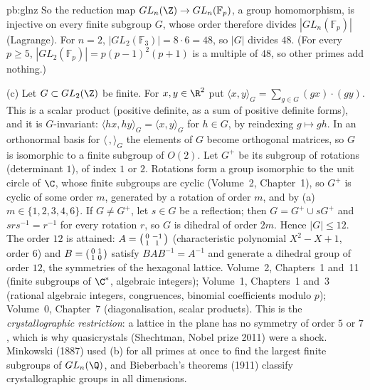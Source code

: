 \begin{solution}{pb:glnz}
So the reduction map $GL_n(\Z)\to GL_n(\mathbb F_p)$, a group homomorphism, is injective on every finite subgroup $G$, whose
order therefore divides $|GL_n(\mathbb F_p)|$ (Lagrange). For $n=2$, $|GL_2(\mathbb F_3)|=8\cdot6=48$, so $|G|$ divides $48$.
(For every $p\ge5$, $|GL_2(\mathbb F_p)|=p(p-1)^2(p+1)$ is a multiple of $48$, so other primes add nothing.)

(c) Let $G\subset GL_2(\Z)$ be finite. For $x,y\in\R^2$ put $\langle x,y\rangle_G=\sum_{g\in G}(gx)\cdot(gy)$. This is a scalar
product (positive definite, as a sum of positive definite forms), and it is $G$-invariant: $\langle hx,hy\rangle_G=\langle x,
y\rangle_G$ for $h\in G$, by reindexing $g\mapsto gh$. In an orthonormal basis for $\langle\,,\rangle_G$ the elements of $G$
become orthogonal matrices, so $G$ is isomorphic to a finite subgroup of $O(2)$. Let $G^+$ be its subgroup of rotations
(determinant $1$), of index $1$ or $2$. Rotations form a group isomorphic to the unit circle of $\C$, whose finite subgroups are
cyclic (Volume~2, Chapter~1), so $G^+$ is cyclic of some order $m$, generated by a rotation of order $m$, and by (a)
$m\in\{1,2,3,4,6\}$. If $G\ne G^+$, let $s\in G$ be a reflection; then $G=G^+\cup sG^+$ and $srs^{-1}=r^{-1}$ for every rotation
$r$, so $G$ is dihedral of order $2m$. Hence $|G|\le12$. The order $12$ is attained: $A=\begin{psmallmatrix}0&-1\\1&1
\end{psmallmatrix}$ (characteristic polynomial $X^2-X+1$, order $6$) and $B=\begin{psmallmatrix}0&1\\1&0\end{psmallmatrix}$
satisfy $BAB^{-1}=A^{-1}$ and generate a dihedral group of order $12$, the symmetries of the hexagonal lattice.
\tools Volume~2, Chapters~1 and~11 (finite subgroups of $\C^*$, algebraic integers); Volume~1, Chapters~1 and~3 (rational
algebraic integers, congruences, binomial coefficients modulo $p$); Volume~0, Chapter~7 (diagonalisation, scalar products).
\leads This is the \emph{crystallographic restriction}: a lattice in the plane has no symmetry of order $5$ or $7$, which is
why quasicrystals (Shechtman, Nobel prize 2011) were a shock. Minkowski (1887) used (b) for all primes at once to find the
largest finite subgroups of $GL_n(\Q)$, and Bieberbach's theorems (1911) classify crystallographic groups in all dimensions.
\end{solution}

